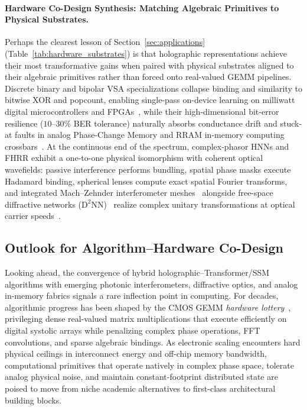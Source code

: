 \paragraph{Hardware Co-Design Synthesis: Matching Algebraic Primitives to Physical Substrates.}
Perhaps the clearest lesson of Section~\ref{sec:applications} (Table~\ref{tab:hardware_substrates}) is that holographic representations achieve their most transformative gains when paired with physical substrates aligned to their algebraic primitives rather than forced onto real-valued GEMM pipelines.
Discrete binary and bipolar VSA specializations collapse binding and similarity to bitwise XOR and popcount, enabling single-pass on-device learning on milliwatt digital microcontrollers and FPGAs~\cite{RAHIMI_HDC_EDGE,KIM_2020_GENIEHD}, while their high-dimensional bit-error resilience ($10\text{--}30\%$ BER tolerance) naturally absorbs conductance drift and stuck-at faults in analog Phase-Change Memory and RRAM in-memory computing crossbars~\cite{KARUNARATNE_2020_PCM_HDC}.
At the continuous end of the spectrum, complex-phasor HNNs and FHRR exhibit a one-to-one physical isomorphism with coherent optical wavefields: passive interference performs bundling, spatial phase masks execute Hadamard binding, spherical lenses compute exact spatial Fourier transforms, and integrated Mach--Zehnder interferometer meshes~\cite{SHEN_PHOTONIC_MZI,CLEMENTS_2016_MZI} alongside free-space diffractive networks ($\text{D}^2\text{NN}$)~\cite{LIN_DIFFRACTIVE_OPTICAL_NN} realize complex unitary transformations at optical carrier speeds~\cite{WETZSTEIN_2020_OPTICAL_AI,MCMAHON_2023_PHYSICS_OPTICAL_NN}.

\subsection{Outlook for Algorithm--Hardware Co-Design}\label{sec:conclusion:outlook}

Looking ahead, the convergence of hybrid holographic--Transformer/SSM algorithms with emerging photonic interferometers, diffractive optics, and analog in-memory fabrics signals a rare inflection point in computing.
For decades, algorithmic progress has been shaped by the CMOS GEMM \emph{hardware lottery}~\cite{HOOKER_2021_HARDWARE_LOTTERY}, privileging dense real-valued matrix multiplications that execute efficiently on digital systolic arrays while penalizing complex phase operations, FFT convolutions, and sparse algebraic bindings.
As electronic scaling encounters hard physical ceilings in interconnect energy and off-chip memory bandwidth, computational primitives that operate natively in complex phase space, tolerate analog physical noise, and maintain constant-footprint distributed state are poised to move from niche academic alternatives to first-class architectural building blocks.

